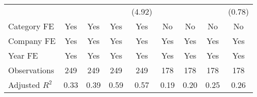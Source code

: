 {\begin{tabular}{l*{8}{c}}
                                   &                     &                     &                     &      (4.92)         &                     &                     &                     &      (0.78)         \\
[1em]
Category FE                        &         Yes         &         Yes         &         Yes         &         Yes         &          No         &          No         &          No         &          No         \\
[1em]
Company FE                         &         Yes         &         Yes         &         Yes         &         Yes         &         Yes         &         Yes         &         Yes         &         Yes         \\
[1em]
Year FE                            &         Yes         &         Yes         &         Yes         &         Yes         &         Yes         &         Yes         &         Yes         &         Yes         \\
\hline
Observations                       &         249         &         249         &         249         &         249         &         178         &         178         &         178         &         178         \\
Adjusted \(R^{2}\)                 &        0.33         &        0.39         &        0.59         &        0.57         &        0.19         &        0.20         &        0.25         &        0.26         \\
\hline\hline
\end{tabular}
}
